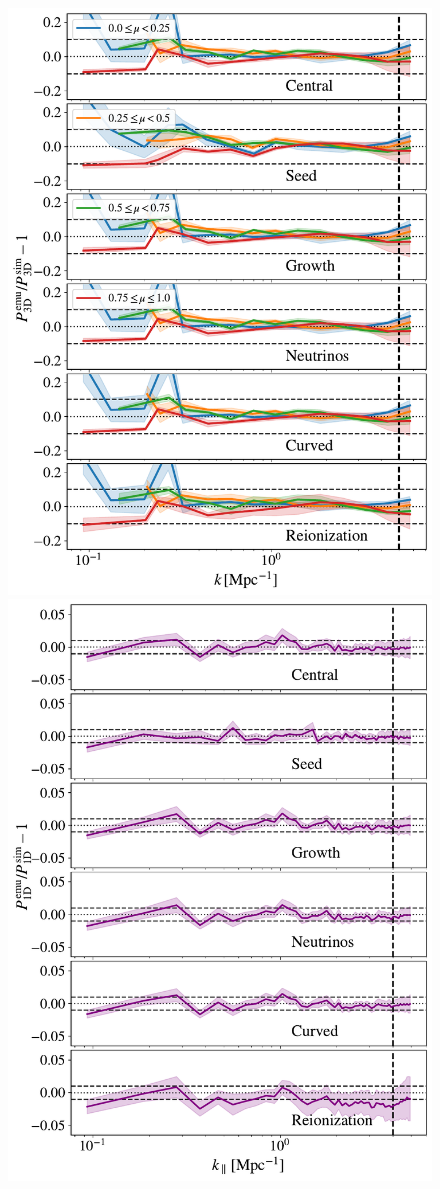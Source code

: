 \documentclass{aa}
\begin{document}
\begin{figure}
\includegraphics[width= 0.95\columnwidth]{figures/test_cosmo_P3D.pdf}
\includegraphics[width= 0.96\columnwidth]{figures/test_cosmo_P1D.pdf}

\end{figure}
\end{document}
